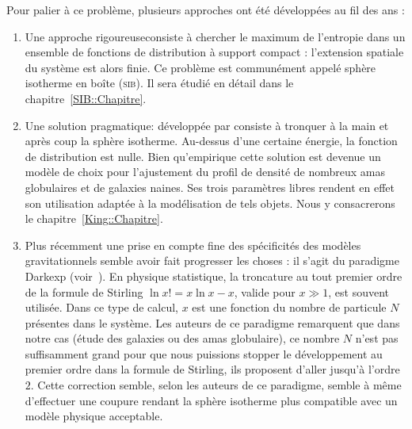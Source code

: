 Pour palier à ce problème, plusieurs approches ont été développées au fil des ans :

\begin{enumerate}
	\item Une approche \og{}rigoureuse\fg consiste à chercher le maximum de l'entropie dans un ensemble de fonctions de distribution à support compact :
		l'extension spatiale du système est alors finie. Ce problème est communément appelé sphère
		isotherme en boîte (\textsc{sib}). Il sera étudié en détail dans le chapitre~\ref{SIB::Chapitre}.
		
	\item Une solution \og{}pragmatique\fg: développée par \cite{King-1966AJ} consiste à tronquer à la main
		et après coup la sphère isotherme. Au-dessus d'une certaine énergie, la fonction de
		distribution est nulle. Bien qu'empirique cette solution est devenue un modèle de choix pour
		l'ajustement du profil de densité de nombreux amas globulaires et de galaxies naines. Ses trois
		paramètres libres rendent en effet son utilisation adaptée à la modélisation de tels objets.
		Nous y consacrerons le chapitre~\ref{King::Chapitre}.
	
	\item Plus récemment une prise en compte fine des spécificités des modèles gravitationnels semble avoir fait progresser les choses :
		il s'agit du paradigme Darkexp (voir~\citet{2010ApJ...722..851H}). En physique statistique, la troncature au tout premier ordre de la
		formule de Stirling $\ln x! = x\ln x
		-x$, valide pour $x\gg1$, est souvent utilisée. Dans ce type de calcul, $x$ est une fonction du nombre de particule $N$
		présentes dans le système. Les auteurs de ce paradigme remarquent que dans notre cas (étude des galaxies ou des amas
		globulaire), ce nombre $N$ n'est pas suffisamment grand pour que nous puissions stopper le développement au premier ordre dans la
		formule de Stirling, ils proposent d'aller jusqu'à l'ordre $2$. Cette
		correction semble, selon les auteurs de ce paradigme, semble à même d'effectuer une coupure rendant la sphère isotherme plus
		compatible avec un modèle physique acceptable.

\end{enumerate}
